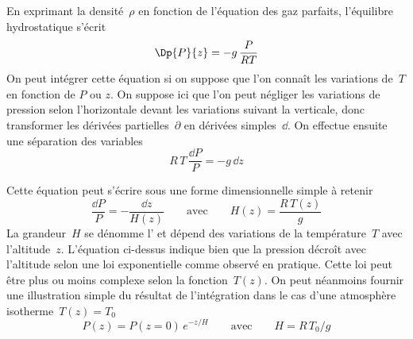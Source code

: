 \sk
En exprimant la densité~$\rho$ en fonction de l'équation des gaz parfaits, l'équilibre hydrostatique s'écrit
\[ \Dp{P}{z} = - g \, \frac{P}{RT} \]
On peut intégrer cette équation si on suppose que l'on connaît les variations de~$T$ en fonction de $P$ ou $z$. On suppose ici que l'on peut négliger les variations de pression selon l'horizontale devant les variations suivant la verticale, donc transformer les dérivées partielles~$\partial$ en dérivées simples~$\dd$. On effectue ensuite une séparation des variables
\[R \, T \, \frac{\dd P}{P} = - g \, \dd z\]

\sk
Cette équation peut s'écrire sous une forme dimensionnelle simple à retenir
\[ \boxed{ \frac{\dd P}{P} = - \frac{\dd z}{H(z)} \qquad \text{avec} \qquad H(z) = \frac{R \, T(z)}{g} } \]
La grandeur~$H$ se dénomme l' et dépend des variations de la température~$T$ avec l'altitude~$z$. L'équation ci-dessus indique bien que la pression décroît avec l'altitude selon une loi exponentielle comme observé en pratique. Cette loi peut être plus ou moins complexe selon la fonction~$T(z)$. On peut néanmoins fournir une illustration simple du résultat de l'intégration dans le cas d'une atmosphère isotherme~$T(z)=T_0$
\[ P(z) = P(z=0) \, e^{-z/H} \qquad \text{avec} \qquad H = R \, T_0 / g \]


